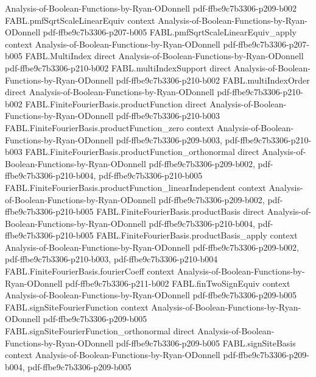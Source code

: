 \begin{theorem}
  {Analysis-of-Boolean-Functions-by-Ryan-ODonnell}
  {pdf-ffbe9c7b3306-p209-b002}
\proofstep
  {FABL.pmfSqrtScaleLinearEquiv}
  {context}
  {Analysis-of-Boolean-Functions-by-Ryan-ODonnell}
  {pdf-ffbe9c7b3306-p207-b005}
\proofstep
  {FABL.pmfSqrtScaleLinearEquiv_apply}
  {context}
  {Analysis-of-Boolean-Functions-by-Ryan-ODonnell}
  {pdf-ffbe9c7b3306-p207-b005}
\proofstep
  {FABL.MultiIndex}
  {direct}
  {Analysis-of-Boolean-Functions-by-Ryan-ODonnell}
  {pdf-ffbe9c7b3306-p210-b002}
\proofstep
  {FABL.multiIndexSupport}
  {direct}
  {Analysis-of-Boolean-Functions-by-Ryan-ODonnell}
  {pdf-ffbe9c7b3306-p210-b002}
\proofstep
  {FABL.multiIndexOrder}
  {direct}
  {Analysis-of-Boolean-Functions-by-Ryan-ODonnell}
  {pdf-ffbe9c7b3306-p210-b002}
\proofstep
  {FABL.FiniteFourierBasis.productFunction}
  {direct}
  {Analysis-of-Boolean-Functions-by-Ryan-ODonnell}
  {pdf-ffbe9c7b3306-p210-b003}
\proofstep
  {FABL.FiniteFourierBasis.productFunction_zero}
  {context}
  {Analysis-of-Boolean-Functions-by-Ryan-ODonnell}
  {pdf-ffbe9c7b3306-p209-b003,
    pdf-ffbe9c7b3306-p210-b003}
\proofstep
  {FABL.FiniteFourierBasis.productFunction_orthonormal}
  {direct}
  {Analysis-of-Boolean-Functions-by-Ryan-ODonnell}
  {pdf-ffbe9c7b3306-p209-b002,
    pdf-ffbe9c7b3306-p210-b004,
    pdf-ffbe9c7b3306-p210-b005}
\proofstep
  {FABL.FiniteFourierBasis.productFunction_linearIndependent}
  {context}
  {Analysis-of-Boolean-Functions-by-Ryan-ODonnell}
  {pdf-ffbe9c7b3306-p209-b002,
    pdf-ffbe9c7b3306-p210-b005}
\proofstep
  {FABL.FiniteFourierBasis.productBasis}
  {direct}
  {Analysis-of-Boolean-Functions-by-Ryan-ODonnell}
  {pdf-ffbe9c7b3306-p210-b004,
    pdf-ffbe9c7b3306-p210-b005}
\proofstep
  {FABL.FiniteFourierBasis.productBasis_apply}
  {context}
  {Analysis-of-Boolean-Functions-by-Ryan-ODonnell}
  {pdf-ffbe9c7b3306-p209-b002,
    pdf-ffbe9c7b3306-p210-b003,
    pdf-ffbe9c7b3306-p210-b004}
\proofstep
  {FABL.FiniteFourierBasis.fourierCoeff}
  {context}
  {Analysis-of-Boolean-Functions-by-Ryan-ODonnell}
  {pdf-ffbe9c7b3306-p211-b002}
\proofstep
  {FABL.finTwoSignEquiv}
  {context}
  {Analysis-of-Boolean-Functions-by-Ryan-ODonnell}
  {pdf-ffbe9c7b3306-p209-b005}
\proofstep
  {FABL.signSiteFourierFunction}
  {context}
  {Analysis-of-Boolean-Functions-by-Ryan-ODonnell}
  {pdf-ffbe9c7b3306-p209-b005}
\proofstep
  {FABL.signSiteFourierFunction_orthonormal}
  {direct}
  {Analysis-of-Boolean-Functions-by-Ryan-ODonnell}
  {pdf-ffbe9c7b3306-p209-b005}
\proofstep
  {FABL.signSiteBasis}
  {context}
  {Analysis-of-Boolean-Functions-by-Ryan-ODonnell}
  {pdf-ffbe9c7b3306-p209-b004,
    pdf-ffbe9c7b3306-p209-b005}

\end{theorem}
